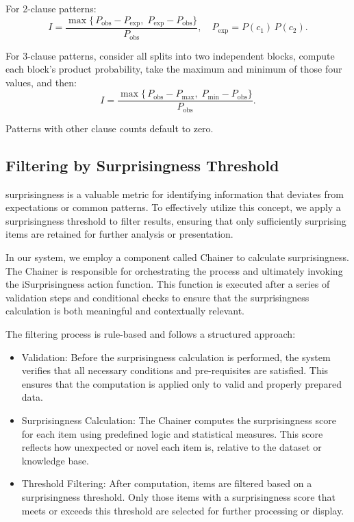 \documentclass{article}
\begin{document}
For 2-clause patterns:
\[
  I = \frac{\max\{\,P_{\mathrm{obs}}-P_{\mathrm{exp}},\;P_{\mathrm{exp}}-P_{\mathrm{obs}}\}}{P_{\mathrm{obs}}},
  \quad
  P_{\mathrm{exp}} = P(c_{1})\,P(c_{2}).
\]

For 3-clause patterns, consider all splits into two independent blocks, compute each block's product probability, take the maximum and minimum of those four values, and then:
\[
  I = \frac{\max\{\,P_{\mathrm{obs}}-P_{\mathrm{max}},\;P_{\mathrm{min}}-P_{\mathrm{obs}}\}}{P_{\mathrm{obs}}}.
\]

Patterns with other clause counts default to zero.

\subsection{Filtering by Surprisingness Threshold}

surprisingness is a valuable metric for identifying information that deviates from expectations or common patterns. To effectively utilize this concept, we apply a surprisingness threshold to filter results, ensuring that only sufficiently surprising items are retained for further analysis or presentation.

In our system, we employ a component called Chainer to calculate surprisingness. The Chainer is responsible for orchestrating the process and ultimately invoking the iSurprisingness action function. This function is executed after a series of validation steps and conditional checks to ensure that the surprisingness calculation is both meaningful and contextually relevant.

The filtering process is rule-based and follows a structured approach:

\begin{itemize}
\item Validation:
  Before the surprisingness calculation is performed, the system verifies that all necessary conditions and pre-requisites are satisfied. This ensures that the computation is applied only to valid and properly prepared data.
\item Surprisingness Calculation:
The Chainer computes the surprisingness score for each item using predefined logic and statistical measures. This score reflects how unexpected or novel each item is, relative to the dataset or knowledge base.
\item Threshold Filtering:
  After computation, items are filtered based on a surprisingness threshold. Only those items with a surprisingness score that meets or exceeds this threshold are selected for further processing or display.
\end{itemize}
\end{document}
